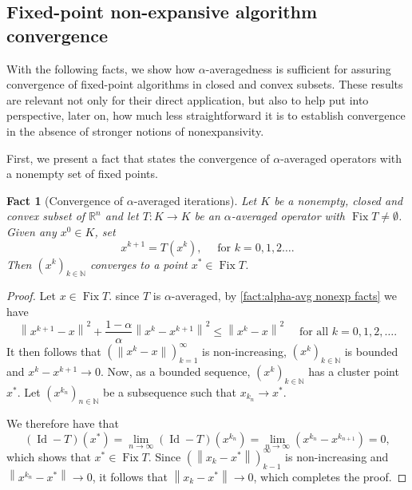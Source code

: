 \documentclass[smallextended,numbook,nospthms]{svjour3}
\theoremstyle{plain}
\newtheorem{fact}[theorem]{Fact}
\theoremstyle{definition}
\def\RR{\mathds R}
\def\NN{\mathds N}
\DeclareMathOperator{\Id}{Id}
\DeclareMathOperator{\Fix}{Fix}
\begin{document}
\subsection{Fixed-point non-expansive algorithm convergence}\label{subsec:fix conv}
With the following facts, we show how $\alpha$-averagedness is sufficient for assuring convergence of fixed-point algorithms in closed and convex subsets. These results are relevant not only for their direct application, but also to help put into perspective, later on, how much less straightforward it is to establish convergence in the absence of stronger notions of nonexpansivity.

First, we present a fact that states the convergence of $\alpha$-averaged operators with a nonempty set of fixed points.
\begin{fact}[Convergence of $\alpha$-averaged iterations]\label{fact:conv avg iter} Let $K$ be a nonempty, closed and convex subset of $\RR^n$ and let $T: K \rightarrow K$ be an $\alpha$-averaged operator with $\Fix T \neq \emptyset$. Given any $x^{0} \in K$, set
\[
x^{k+1}=T\left(x^{k}\right), \quad \text { for } k=0,1,2 \dots.
\]
Then $\left(x^{k}\right)_{k \in \NN}$ converges to a point $x^{*} \in \Fix T$.
\end{fact}
\begin{proof}
Let $x \in \Fix T$. since $T$ is $\alpha$-averaged, by \cref{fact:alpha-avg nonexp facts} we have
\[
\left\|x^{k+1}-x\right\|^{2}+\frac{1-\alpha}{\alpha}\left\|x^{k}-x^{k+1}\right\|^{2} \leq\left\|x^{k}-x\right\|^{2} \quad \text { for all } k=0,1,2, \dots.
\]
It then follows that $\left(\|x^{k}-x\|\right)_{k=1}^{\infty}$ is non-increasing, $\left(x^{k}\right)_{k \in \NN}$ is bounded and $x^{k}-x^{k+1} \rightarrow 0$. Now, as a bounded sequence, $\left(x^{k}\right)_{k \in \NN}$ has a cluster point $x^{*}$. Let $\left(x^{k_{n}}\right)_{n \in \NN}$ be a subsequence such that $x_{k_{n}} \rightarrow x^{*}$. 

We therefore have that
\[
(\Id-T)\left(x^{*}\right)=\lim _{n \rightarrow \infty}(\Id-T)\left(x^{k_{n}}\right)=\lim _{n \rightarrow \infty}\left(x^{k_{n}}-x^{k_{n+1}}\right)=0,
\]
which shows that $x^{*} \in \Fix T$. Since $\left(\left\|x_{k}-x^{*}\right\|\right)_{k-1}^{\infty}$ is non-increasing and $\left\|x^{k_{n}}-x^{*}\right\| \rightarrow 0$, it follows that $\left\|x_{k}-x^{*}\right\| \rightarrow 0$, which completes the proof.
\end{proof}
\end{document}
